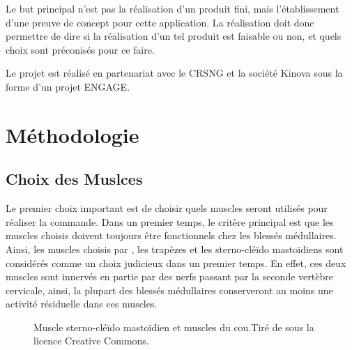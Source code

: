 \documentclass[letterpaper, twoside, 12pt, memoire, creativecommons, hyperref]{thETS}
\begin{document}
Le but principal n'est pas la réalisation d'un produit fini, mais l'établissement d'une preuve de concept pour cette application. La réalisation doit donc permettre de dire si la réalisation d'un tel produit est faisable ou non, et quels choix sont préconisés pour ce faire.

Le projet est réalisé en partenariat avec le CRSNG et la société Kinova sous la forme d'un projet ENGAGE. 

\chapter{Méthodologie}
\label{CHmethodo}

\section{Choix des Muslces}

Le premier choix important est de choisir quels muscles seront utilisés pour réaliser la commande. Dans un premier temps, le critère principal est que les muscles choisis doivent toujours être fonctionnels chez les blessés médullaires. Ainsi, les muscles choisis par \cite{Chang1996}, les trapèzes et les sterno-cléïdo mastoïdiens sont considérés comme un choix judicieux dans un premier temps. En effet, ces deux muscles sont innervés en partie par des nerfs passant par la seconde vertèbre cervicale, ainsi, la plupart des blessés médullaires conserveront au moins une activité résiduelle dans ces muscles. 

\begin{figure}
	\centering
	\caption{Muscle sterno-cléïdo mastoïdien et muscles du cou.Tiré de \cite{sternoWiki} sous la licence Creative Commons.}
	\label{fig:muscles}
\end{figure}
\end{document}

